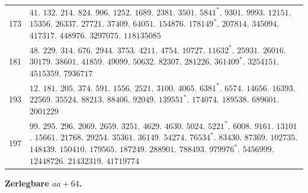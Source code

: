 \begin{longtable}{@{}r|p{\dimexpr\linewidth-38pt\relax}@{}}
173 & $41$. $132$. $214$. $824$. $906$. $1252$. $1689$. $2381$. $3501$. $5841^{*}$. $9301$. $9993$. $12151$. $15356$. $26337$. $27721$. $37409$. $64051$. $154876$. $178149^{*}$. $207814$. $345094$. $417317$. $448976$. $3297075$. $118135085$\\
181 & $48$. $229$. $314$. $676$. $2944$. $3753$. $4211$. $4754$. $10727$. $11632^{*}$. $25931$. $26016$. $30179$. $38601$. $41859$. $49099$. $50632$. $82307$. $281226$. $361409^{*}$. $3254151$. $4515359$. $7936717$\\
193 & $12$. $181$. $205$. $374$. $591$. $1556$. $2521$. $3100$. $4065$. $6381^{*}$. $6574$. $14656$. $16393$. $22569$. $35524$. $88213$. $88406$. $92049$. $139551^{*}$. $174074$. $189538$. $689601$. $2001229$\\
197 & $99$. $295$. $296$. $2069$. $2659$. $3251$. $4629$. $4630$. $5024$. $5221^{*}$. $6008$. $9161$. $13101$. $15661$. $21768$. $29254$. $35361$. $36149$. $54274$. $76534^{*}$. $83430$. $87369$. $102735$. $148439$. $150410$. $179565$. $187249$. $288901$. $788493$. $979976^{*}$. $5456999$. $12448726$. $21432319$. $41719774$\\
\end{longtable}\endgroup
\par{}
\begin{center}\textbf{Zerlegbare $aa+64$.}\end{center}
\begingroup\small\setlength{\tabcolsep}{5pt}

